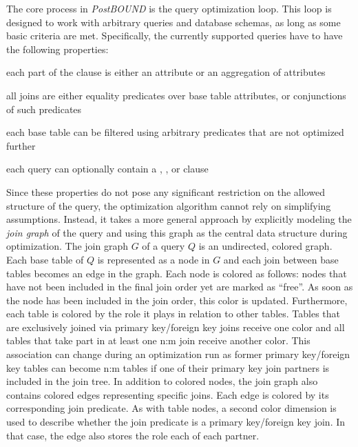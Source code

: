 The core process in \emph{PostBOUND} is the query optimization loop. 
This loop is designed to work with arbitrary queries and database schemas, as long as some basic criteria are met. 
Specifically, the currently supported queries have to have the following properties:
\begin{compactitem}
    \item each part of the  clause is either an attribute or an aggregation of attributes
    \item all joins are either equality predicates over base table attributes, or conjunctions of such predicates
    \item each base table can be filtered using arbitrary predicates that are not optimized further
    \item each query can optionally contain a , , or  clause
\end{compactitem}

Since these properties do not pose any significant restriction on the allowed structure of the query, the optimization algorithm cannot rely on simplifying assumptions. 
Instead, it takes a more general approach by explicitly modeling the \emph{join graph} of the query and using this graph as the central data structure during optimization. 
The join graph $G$ of a query $Q$ is an undirected, colored graph. 
Each base table of $Q$ is represented as a node in $G$ and each join between base tables becomes an edge in the graph. 
Each node is colored as follows: nodes that have not been included in the final join order yet are marked as ``free''. 
As soon as the node has been included in the join order, this color is updated. 
Furthermore, each table is colored by the role it plays in relation to other tables. 
Tables that are exclusively joined via primary key/foreign key joins receive one color and all tables that take part in at least one n:m join receive another color. 
This association can change during an optimization run as former primary key/foreign key tables can become n:m tables if one of their primary key join partners is included in the join tree. 
In addition to colored nodes, the join graph also contains colored edges representing specific joins. 
Each edge is colored by its corresponding join predicate. 
As with table nodes, a second color dimension is used to describe whether the join predicate is a primary key/foreign key join.
In that case, the edge also stores the role each of each partner.

